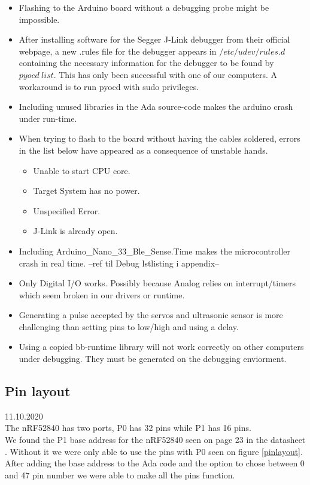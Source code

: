 \documentclass{article}
\begin{document}
\begin{itemize}
	\item Flashing to the Arduino board without a debugging probe might be impossible.

	\item After installing software for the Segger J-Link debugger from their official webpage, a new .rules file for the debugger appears in $/etc/udev/rules.d$ containing the necessary information for the debugger to be found by $pyocd\ list$. This has only been successful with one of our computers. A workaround is to run pyocd with sudo privileges.

	\item Including unused libraries in the Ada source-code makes the arduino crash under run-time.

	\item When trying to flash to the board without having the cables soldered, errors in the list below have appeared as a consequence of unstable hands.
		\begin{itemize}
			\item Unable to start CPU core.
			\item Target System has no power.
            \item Unspecified Error.
            \item J-Link is already open.
		\end{itemize}

	\item Including Arduino\_Nano\_33\_Ble\_Sense.Time makes the microcontroller crash in real time. --ref til Debug lstlisting i appendix--

	\item Only Digital I/O works. Possibly because Analog relies on interrupt/timers which seem broken in our drivers or runtime.

	\item Generating a pulse accepted by the servos and ultrasonic sensor is more challenging than setting pins to low/high and using a delay.

	\item Using a copied bb-runtime library will not work correctly on other computers under debugging. They must be generated on the debugging enviorment.

\end{itemize}

\subsection{Pin layout}
11.10.2020\\
The nRF52840 has two ports, P0 has 32 pins while P1 has 16 pins.\\ 
We found the P1 base address for the nRF52840 seen on page 23 in the datasheet \cite{NRF52840}. Without it we were only able to use the pins with P0 seen on figure \ref{pinlayout}. After adding the base address to the Ada code and the option to chose between 0 and 47 pin number we were able to make all the pins function.
\end{document}
